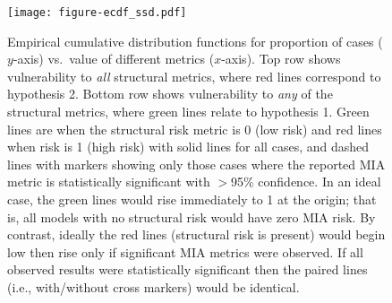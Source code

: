 \begin{figure}[t!]
    \centering
    \texttt{[image: figure-ecdf\_ssd.pdf]}
    \caption{Empirical cumulative distribution functions for proportion of cases ($y$-axis) vs.\ value of different metrics ($x$-axis). Top row shows vulnerability to \textit{all} structural metrics, where red lines correspond to hypothesis 2. Bottom row shows vulnerability to \textit{any} of the structural metrics, where green lines relate to hypothesis 1. Green lines are when the structural risk metric is 0 (low risk) and red lines when risk is 1 (high risk) with solid lines for all cases, and dashed lines with markers showing only those cases where the reported MIA metric is statistically significant with $>$95\% confidence. In an ideal case, the green lines would rise immediately to 1 at the origin; that is, all models with no structural risk would have zero MIA risk. By contrast, ideally the red lines (structural risk is present) would begin low then rise only if significant MIA metrics were observed. If all observed results were statistically significant then the paired lines (i.e., with/without cross markers) would be identical.}%
    \label{fig:ecdf_metrics_ssd}
\end{figure}
